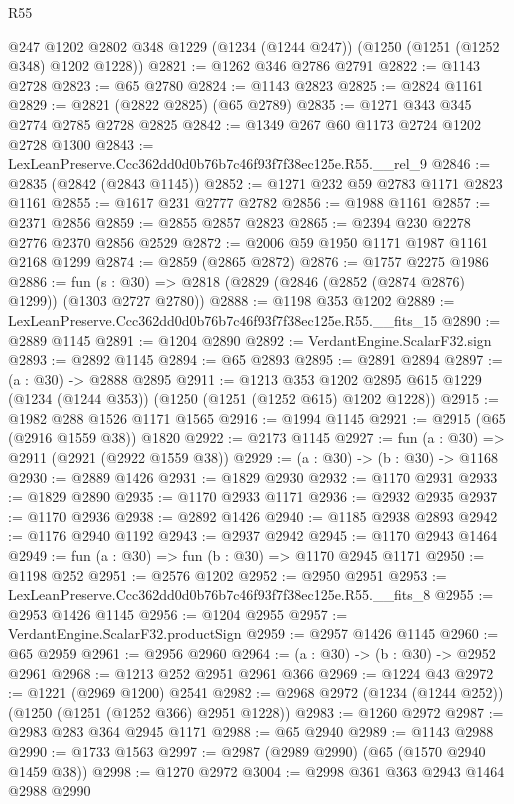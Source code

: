 \begin{lexlean}{R55}
\begin{coremodule}
    @247
    @1202
    @2802
    @348
    @1229
    (@1234 (@1244 @247))
    (@1250 (@1251 (@1252 @348) @1202 @1228))
@2821 := @1262 @346 @2786 @2791
@2822 := @1143 @2728
@2823 := @65 @2780
@2824 := @1143 @2823
@2825 := @2824 @1161
@2829 := @2821 (@2822 @2825) (@65 @2789)
@2835 := @1271 @343 @345 @2774 @2785 @2728 @2825
@2842 := @1349 @267 @60 @1173 @2724 @1202 @2728 @1300
@2843 := LexLeanPreserve.Ccc362dd0d0b76b7c46f93f7f38ec125e.R55.__rel_9
@2846 := @2835 (@2842 (@2843 @1145))
@2852 := @1271 @232 @59 @2783 @1171 @2823 @1161
@2855 := @1617 @231 @2777 @2782
@2856 := @1988 @1161
@2857 := @2371 @2856
@2859 := @2855 @2857 @2823
@2865 := @2394 @230 @2278 @2776 @2370 @2856 @2529
@2872 := @2006 @59 @1950 @1171 @1987 @1161 @2168 @1299
@2874 := @2859 (@2865 @2872)
@2876 := @1757 @2275 @1986
@2886 := fun (s : @30) => @2818 (@2829 (@2846 (@2852 (@2874 @2876) @1299)) (@1303 @2727 @2780))
@2888 := @1198 @353 @1202
@2889 := LexLeanPreserve.Ccc362dd0d0b76b7c46f93f7f38ec125e.R55.__fits_15
@2890 := @2889 @1145
@2891 := @1204 @2890
@2892 := VerdantEngine.ScalarF32.sign
@2893 := @2892 @1145
@2894 := @65 @2893
@2895 := @2891 @2894
@2897 := (a : @30) -> @2888 @2895
@2911 := @1213
    @353
    @1202
    @2895
    @615
    @1229
    (@1234 (@1244 @353))
    (@1250 (@1251 (@1252 @615) @1202 @1228))
@2915 := @1982 @288 @1526 @1171 @1565
@2916 := @1994 @1145
@2921 := @2915 (@65 (@2916 @1559 @38)) @1820
@2922 := @2173 @1145
@2927 := fun (a : @30) => @2911 (@2921 (@2922 @1559 @38))
@2929 := (a : @30) -> (b : @30) -> @1168
@2930 := @2889 @1426
@2931 := @1829 @2930
@2932 := @1170 @2931
@2933 := @1829 @2890
@2935 := @1170 @2933 @1171
@2936 := @2932 @2935
@2937 := @1170 @2936
@2938 := @2892 @1426
@2940 := @1185 @2938 @2893
@2942 := @1176 @2940 @1192
@2943 := @2937 @2942
@2945 := @1170 @2943 @1464
@2949 := fun (a : @30) => fun (b : @30) => @1170 @2945 @1171
@2950 := @1198 @252
@2951 := @2576 @1202
@2952 := @2950 @2951
@2953 := LexLeanPreserve.Ccc362dd0d0b76b7c46f93f7f38ec125e.R55.__fits_8
@2955 := @2953 @1426 @1145
@2956 := @1204 @2955
@2957 := VerdantEngine.ScalarF32.productSign
@2959 := @2957 @1426 @1145
@2960 := @65 @2959
@2961 := @2956 @2960
@2964 := (a : @30) -> (b : @30) -> @2952 @2961
@2968 := @1213 @252 @2951 @2961 @366
@2969 := @1224 @43
@2972 := @1221 (@2969 @1200) @2541
@2982 := @2968 @2972 (@1234 (@1244 @252)) (@1250 (@1251 (@1252 @366) @2951 @1228))
@2983 := @1260 @2972
@2987 := @2983 @283 @364 @2945 @1171
@2988 := @65 @2940
@2989 := @1143 @2988
@2990 := @1733 @1563
@2997 := @2987 (@2989 @2990) (@65 (@1570 @2940 @1459 @38))
@2998 := @1270 @2972
@3004 := @2998 @361 @363 @2943 @1464 @2988 @2990

\end{coremodule}
\end{lexlean}
